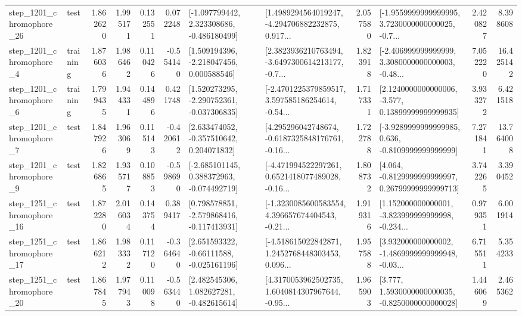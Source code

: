 \begin{tabular}{llrrrrllrlrr}
 step\_1201\_chromophore\_26 &      test &      1.862620 &    1.995171 &      0.132551 &  0.072248 &   [-1.097799442, 2.323308686, -0.486180499] &  [1.4989294564019247, -4.294706882232875, 0.917... &       2.057580 &  [-1.9559999999999995, 3.7230000000000025, -0.7... &            2.420827 &          8.398608 \\
  step\_1201\_chromophore\_4 &  training &      1.876036 &    1.986462 &      0.110426 & -0.554140 &    [1.509194396, -2.218047456, 0.000588546] &  [2.3823936210763494, -3.6497300614213177, -0.7... &       1.823918 &  [-2.406999999999999, 3.3080000000000003, -0.48... &            7.052220 &         16.425142 \\
  step\_1201\_chromophore\_6 &  training &      1.799435 &    1.944331 &      0.144896 &  0.421748 &   [1.520273295, -2.290752361, -0.037306835] &  [-2.4701225379859517, 3.597585186254614, -0.54... &       1.717331 &  [2.1240000000000006, -3.577, 0.13899999999999935] &            3.933272 &          6.421518 \\
  step\_1201\_chromophore\_7 &      test &      1.847926 &    1.963069 &      0.115143 & -0.420612 &    [2.633474052, -0.357510642, 0.204071832] &  [4.295296042748674, -0.6187325848176761, -0.16... &       1.722788 &  [-3.9289999999999985, 0.636, -0.8109999999999999] &            7.271841 &         13.764008 \\
  step\_1201\_chromophore\_9 &      test &      1.826865 &    1.935717 &      0.108853 & -0.598690 &   [-2.685101145, 0.388372963, -0.074492719] &  [-4.471994522297261, 0.6521418077489028, -0.16... &       1.808732 &  [4.064, -0.8129999999999997, 0.26799999999999713] &            3.742265 &          3.390452 \\
 step\_1251\_chromophore\_16 &      test &      1.872280 &    2.016034 &      0.143754 &  0.389417 &   [0.798578851, -2.579868416, -0.117413931] &  [-1.3230085600583554, 4.396657674404543, -0.21... &       1.919316 &  [1.152000000000001, -3.823999999999998, -0.234... &            0.979351 &          6.001914 \\
 step\_1251\_chromophore\_17 &      test &      1.866212 &    1.983332 &      0.117120 & -0.364640 &    [2.651593322, -0.66111588, -0.025161196] &  [-4.518615022842871, 1.2452768448303453, 0.096... &       1.957588 &  [3.932000000000002, -1.4869999999999948, -0.03... &            6.715511 &          5.354233 \\
 step\_1251\_chromophore\_20 &      test &      1.867845 &    1.977943 &      0.110098 & -0.563440 &    [2.482545306, 1.082627281, -0.482615614] &  [4.3170053962502735, 1.6040814307967644, -0.95... &       1.965903 &   [3.777, 1.5930000000000035, -0.8250000000000028] &            1.446069 &          2.465362 \\

\end{tabular}
